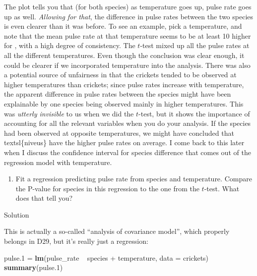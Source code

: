 \documentclass[]{tufte-book}
\newenvironment{Shaded}{}{}
\newcommand{\DataTypeTok}[1]{\textcolor[rgb]{0.56,0.13,0.00}{#1}}
\newcommand{\FloatTok}[1]{\textcolor[rgb]{0.25,0.63,0.44}{#1}}
\newcommand{\KeywordTok}[1]{\textcolor[rgb]{0.00,0.44,0.13}{\textbf{#1}}}
\newcommand{\NormalTok}[1]{#1}
\newcommand{\OperatorTok}[1]{\textcolor[rgb]{0.40,0.40,0.40}{#1}}
\newcommand{\StringTok}[1]{\textcolor[rgb]{0.25,0.44,0.63}{#1}}
\providecommand{\tightlist}{%
  \setlength{\itemsep}{0pt}\setlength{\parskip}{0pt}}
\theoremstyle{definition}
\theoremstyle{definition}
\theoremstyle{definition}
\theoremstyle{remark}
\begin{document}
The plot tells you that (for both species) as temperature goes up, pulse
rate goes up as well. \emph{Allowing for that}, the difference in pulse
rates between the two species is even clearer than it was before. To see
an example, pick a temperature, and note that the mean pulse rate at
that temperature seems to be at least 10 higher for
, with a high degree of consistency. The
\(t\)-test mixed up all the pulse rates at all the different
temperatures. Even though the conclusion was clear enough, it could be
clearer if we incorporated temperature into the analysis. There was also
a potential source of unfairness in that the 
crickets tended to be observed at higher temperatures than
 crickets; since pulse rates increase with temperature,
the apparent difference in pulse rates between the species might have
been explainable by one species being observed mainly in higher
temperatures. This was \emph{utterly invisible} to us when we did the
\(t\)-test, but it shows the importance of accounting for all the
relevant variables when you do your analysis.
If the species had been observed at opposite temperatures, we might have
concluded  that textsl\{niveus\} have the higher
pulse rates on average. I come back to this later when I discuss the
confidence interval for species difference that comes out of the
regression model with temperature.

\begin{enumerate}
\def\labelenumi{(\alph{enumi})}
\setcounter{enumi}{5}
\tightlist
\item
  Fit a regression predicting pulse rate from species and temperature.
  Compare the P-value for species in this regression to the one from the
  \(t\)-test. What does that tell you?
\end{enumerate}

Solution

This is actually a so-called ``analysis of covariance model'', which
properly belongs in D29, but it's really just a regression:

\begin{Shaded}
\begin{Highlighting}[]
\NormalTok{pulse}\FloatTok{.1}\NormalTok{ =}\StringTok{ }\KeywordTok{lm}\NormalTok{(pulse_rate }\OperatorTok{~}\StringTok{ }\NormalTok{species }\OperatorTok{+}\StringTok{ }\NormalTok{temperature, }
    \DataTypeTok{data =}\NormalTok{ crickets)}
\KeywordTok{summary}\NormalTok{(pulse}\FloatTok{.1}\NormalTok{)}
\end{Highlighting}
\end{Shaded}
\end{document}
